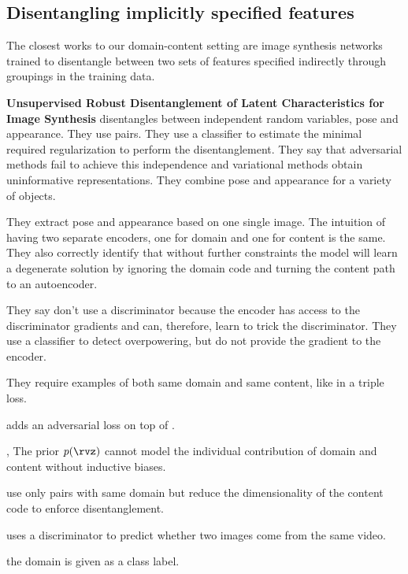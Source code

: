 \subsection{Disentangling implicitly specified features}

The closest works to our domain-content setting are image synthesis networks trained to disentangle between two sets of features specified indirectly through groupings in the training data. 
\cite{kotovenko2019content}

\textbf{Unsupervised Robust Disentanglement of Latent Characteristics for Image Synthesis}
\citet{esser2019unsupervised} disentangles between independent random variables, pose and appearance. They use pairs. They use a classifier to estimate the minimal required regularization to perform the disentanglement. They say that adversarial methods fail to achieve this independence and variational methods obtain uninformative representations. They combine pose and appearance for a variety of objects.

They extract pose and appearance based on one single image. The intuition of having two separate encoders, one for domain and one for content is the same. They also correctly identify that without further constraints the model will learn a degenerate solution by ignoring the domain code and turning the content path to an autoencoder.

They say don't use a discriminator because the encoder has access to the discriminator gradients and can, therefore, learn to trick the discriminator. They use a classifier to detect overpowering, but do not provide the gradient to the encoder.

They require examples of both same domain and same content, like in a triple loss.

\citet{mathieu2016disentangling} adds an adversarial loss on top of \citet{kingma2014semi}.

\citet{locatello2019challenging}, \citet{szabo2017challenges} The prior $p(\rvz)$ cannot model the individual contribution of domain and content without inductive biases.

\citet{szabo2017challenges} use only pairs with same domain but reduce the dimensionality of the content code to enforce disentanglement.

\citet{denton2017unsupervised} uses a discriminator to predict whether two images come from the same video.

\citet{hadad2018two} the domain is given as a class label.

